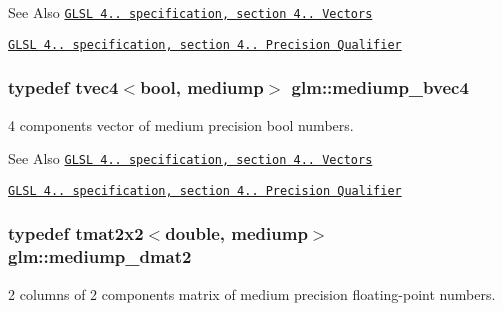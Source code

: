 \begin{DoxySeeAlso}{See Also}
\href{http://www.opengl.org/registry/doc/GLSLangSpec.4.20.8.pdf}{\tt G\-L\-S\-L 4.. specification, section 4.. Vectors} 

\href{http://www.opengl.org/registry/doc/GLSLangSpec.4.20.8.pdf}{\tt G\-L\-S\-L 4.. specification, section 4.. Precision Qualifier} 
\end{DoxySeeAlso}
\hypertarget{group__core__precision_ga92b3f3ba6ecceaea364906ad7ee985a5}{
\subsubsection[{mediump\-\_\-bvec4}]{\setlength{\rightskip}{0pt plus 5cm}typedef tvec4$<$bool, mediump$>$ {\bf glm\-::mediump\-\_\-bvec4}}}\label{group__core__precision_ga92b3f3ba6ecceaea364906ad7ee985a5}
4 components vector of medium precision bool numbers.

\begin{DoxySeeAlso}{See Also}
\href{http://www.opengl.org/registry/doc/GLSLangSpec.4.20.8.pdf}{\tt G\-L\-S\-L 4.. specification, section 4.. Vectors} 

\href{http://www.opengl.org/registry/doc/GLSLangSpec.4.20.8.pdf}{\tt G\-L\-S\-L 4.. specification, section 4.. Precision Qualifier} 
\end{DoxySeeAlso}
\hypertarget{group__core__precision_ga15d28c9d2c24b698597e9ad9e083520d}{
\subsubsection[{mediump\-\_\-dmat2}]{\setlength{\rightskip}{0pt plus 5cm}typedef tmat2x2$<$double, mediump$>$ {\bf glm\-::mediump\-\_\-dmat2}}}\label{group__core__precision_ga15d28c9d2c24b698597e9ad9e083520d}
2 columns of 2 components matrix of medium precision floating-\/point numbers.

